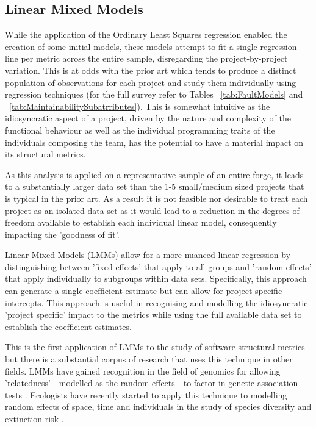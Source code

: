 \subsection{Linear Mixed Models}
While the application of the Ordinary Least Squares regression enabled the creation of some initial models, these models attempt to fit a single regression line per metric across the entire sample, disregarding the project-by-project variation. This is at odds with the prior art which tends to produce a distinct population of observations for each project and study them individually using regression techniques (for the full survey refer to Tables ~\ref{tab:FaultModels} and ~\ref{tab:MaintainabilitySubatrributes}). This is somewhat intuitive as the idiosyncratic aspect of a project, driven by the nature and complexity of the functional behaviour as well as the individual programming traits of the individuals composing the team, has the potential to have a material impact on its structural metrics.

As this analysis is applied on a representative sample of an entire forge, it leads to a substantially larger data set than the 1-5 small/medium sized projects that is typical in the prior art. As a result it is not feasible nor desirable to treat each project as an isolated data set as it would lead to a reduction in the degrees of freedom available to establish each individual linear model, consequently impacting the 'goodness of fit'.

Linear Mixed Models (LMMs) allow for a more nuanced linear regression by distinguishing between 'fixed effects' that apply to all groups and 'random effects' that apply individually to subgroups within data sets. Specifically, this approach can generate a single coefficient estimate but can allow for project-specific intercepts. This approach is useful in recognising and modelling the idiosyncratic 'project specific' impact to the metrics while using the full available data set to establish the coefficient estimates. 

This is the first application of LMMs to the study of software structural metrics but there is a substantial corpus of research that uses this technique in other fields. LMMs have gained recognition in the field of genomics for allowing 'relatedness' - modelled as the random effects - to factor in genetic association tests \citep{zhou2012genome}. Ecologists have recently started to apply this technique to modelling random effects of space, time and individuals in the study of species diversity and extinction risk \citep{bolker2009generalized}.

